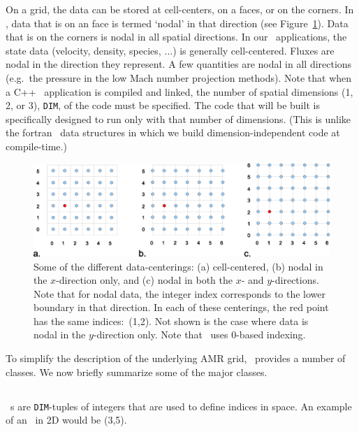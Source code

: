 On a grid, the data can be stored at cell-centers, on a faces, or
on the corners.  In \BoxLib, data that is on an face is termed `nodal'
in that direction (see Figure~\ref{fig:dataloc}).  Data that is on the
corners is nodal in all spatial directions.  In our \BoxLib\ applications, 
the state data (velocity, density, species, $\ldots$) is generally
cell-centered.  Fluxes are nodal in the direction they represent.
A few quantities are nodal in all directions (e.g.\ the pressure in
the low Mach number projection methods).  
Note that when a C++ \BoxLib\ application is compiled and linked,
the number of spatial dimensions (1, 2, or 3), {\tt DIM},
of the code must be specified.  The code that will be
built is specifically designed to run only with that number of dimensions.
(This is unlike the fortran \BoxLib\ data structures in which we build
dimension-independent code at compile-time.)
\begin{figure}[h]
\centering
\includegraphics[width=6.5in]{./BoxLib/data_loc2}
\caption{\label{fig:dataloc} Some of the different data-centerings:
(a) cell-centered, (b) nodal in the $x$-direction only, and (c) nodal in
both the $x$- and $y$-directions.  Note that for nodal data, the
integer index corresponds to the lower boundary in that direction.
In each of these centerings, the red point has the same indices:\ (1,2).
Not shown is the case where data is nodal in the $y$-direction only.  
Note that \BoxLib\ uses $0$-based indexing.}
\end{figure}

To simplify the description of the underlying AMR grid, \BoxLib\
provides a number of classes.  We now briefly summarize some of the major
classes.

\subsection{\IntVect}

\IntVect~s are {\tt DIM}-tuples of integers that are used to define
indices in space.  An example of an \IntVect\ in 2D would
be (3,5).

